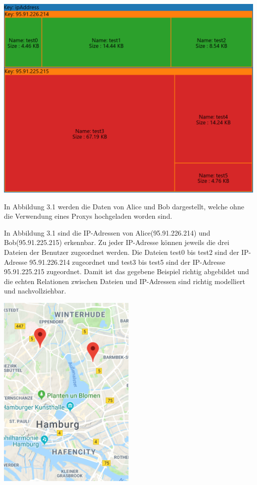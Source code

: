 \documentclass[
    fontsize=12pt,
    headings=small,
    parskip=half,           %
    bibliography=totoc,
    numbers=noenddot,       %
    open=any,               %
    ]{scrreprt}
\begin{document}
\begin{center}
\includegraphics[width=\textwidth]{../pic/IP-Proxy-SetA-tree2.png}
\end{center}

In Abbildung 3.1 werden die Daten von Alice und Bob dargestellt, welche ohne die Verwendung eines Proxys hochgeladen worden sind. 

In Abbildung 3.1 sind die IP-Adressen von Alice(95.91.226.214) und Bob(95.91.225.215) erkennbar. 
Zu jeder IP-Adresse können jeweils die drei Dateien der Benutzer zugeordnet werden. 
Die Dateien test0 bis test2 sind der IP-Adresse 95.91.226.214 zugeordnet und test3 bis test5 sind der IP-Adresse 95.91.225.215 zugeordnet.
Damit ist das gegebene Beispiel richtig abgebildet und die echten Relationen zwischen Dateien und IP-Adressen sind richtig modelliert und nachvollziehbar. 

\begin{center}
\includegraphics[width=0.5\textwidth]{../pic/IP-Proxy-SetA.png}
\end{center}
\end{document}
